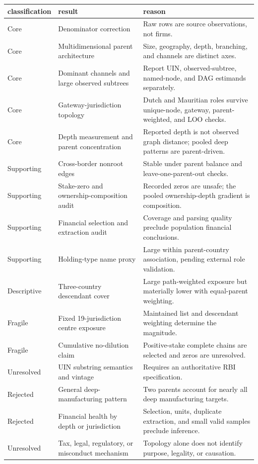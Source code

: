 \begin{tabular}{lll}
\toprule
classification & result & reason \\
\midrule
Core & Denominator correction & Raw rows are source observations, not firms. \\
Core & Multidimensional parent architecture & Size, geography, depth, branching, and channels are distinct axes. \\
Core & Dominant channels and large observed subtrees & Report UIN, observed-subtree, named-node, and DAG estimands separately. \\
Core & Gateway-jurisdiction topology & Dutch and Mauritian roles survive unique-node, gateway, parent-weighted, and LOO checks. \\
Core & Depth measurement and parent concentration & Reported depth is not observed graph distance; pooled deep patterns are parent-driven. \\
Supporting & Cross-border nonroot edges & Stable under parent balance and leave-one-parent-out checks. \\
Supporting & Stake-zero and ownership-composition audit & Recorded zeros are unsafe; the pooled ownership-depth gradient is composition. \\
Supporting & Financial selection and extraction audit & Coverage and parsing quality preclude population financial conclusions. \\
Supporting & Holding-type name proxy & Large within parent-country association, pending external role validation. \\
Descriptive & Three-country descendant cover & Large path-weighted exposure but materially lower with equal-parent weighting. \\
Fragile & Fixed 19-jurisdiction centre exposure & Maintained list and descendant weighting determine the magnitude. \\
Fragile & Cumulative no-dilution claim & Positive-stake complete chains are selected and zeros are unresolved. \\
Unresolved & UIN substring semantics and vintage & Requires an authoritative RBI specification. \\
Rejected & General deep-manufacturing pattern & Two parents account for nearly all deep manufacturing targets. \\
Rejected & Financial health by depth or jurisdiction & Selection, units, duplicate extraction, and small valid samples preclude inference. \\
Unresolved & Tax, legal, regulatory, or misconduct mechanism & Topology alone does not identify purpose, legality, or causation. \\
\bottomrule
\end{tabular}
